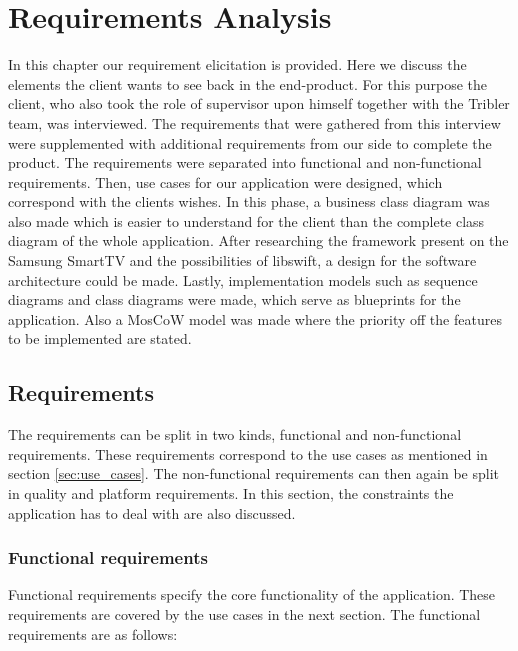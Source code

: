 \chapter{Requirements Analysis}
\label{sec:requirements}
In this chapter our requirement elicitation is provided. Here we discuss the elements the client wants to see back in the end-product. For this purpose the client, who also took the role of supervisor upon himself together with the Tribler team, was interviewed. The requirements that were gathered from this interview were supplemented with additional requirements from our side to complete the product. The requirements were separated into functional and non-functional requirements. Then, use cases for our application were designed, which correspond with the clients wishes. In this phase, a business class diagram was also made which is easier to understand for the client than the complete class diagram of the whole application. 
After researching the framework present on the Samsung SmartTV and the possibilities of libswift, a design for the software architecture could be made. 
Lastly, implementation models such as sequence diagrams and class diagrams were made, which serve as blueprints for the application. Also a MosCoW model was made where the priority off the features to be implemented are stated.

\section{Requirements}
The requirements can be split in two kinds, functional and non-functional requirements. These requirements  correspond to the use cases as mentioned in section \hyperref[sec:use_cases]{\ref*{sec:use_cases}}. The non-functional requirements can then again be split in quality and platform requirements. In this section, the constraints the application has to deal with are also discussed.

\subsection{Functional requirements}
Functional requirements specify the core functionality of the application. These requirements are covered by the use cases in the next section. The functional requirements are as follows:

